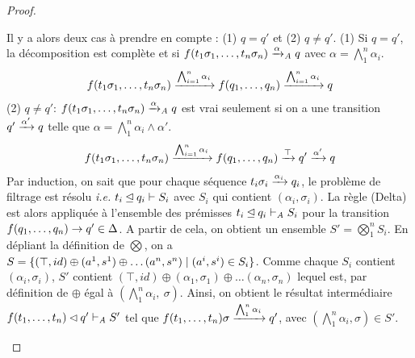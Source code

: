 \begin{proof}
\begin{itemize}
  Il y a alors deux cas à prendre en compte : (1) $q=q'$ et (2) $q \not = q'$.
  (1) Si $q=q'$, la décomposition est complète et si $f(t_1\sigma_1,\dots, t_n\sigma_n) \xrightarrow{\alpha}_\mathit A q$ avec $\alpha = \bigwedge_1^n \alpha_i$.
  \[f(t_1\sigma_1,\dots, t_n\sigma_n) \xrightarrow{\bigwedge_{i = 1}^n \alpha_i} f(q_1,\dots,q_n) \xrightarrow{\bigwedge_{i = 1}^n \alpha_i} q\]
  (2) $q \not = q'$: $f(t_1\sigma_1,\dots, t_n\sigma_n) \xrightarrow{\alpha}_\mathit A q$ est vrai seulement si on a une transition $q' \xrightarrow{\alpha'} q$
  telle que $\alpha = \bigwedge_1^n \alpha_i \land \alpha'$.
  \[f(t_1\sigma_1,\dots, t_n\sigma_n) \xrightarrow{\bigwedge_{i = 1}^n \alpha_i} f(q_1,\dots,q_n) \xrightarrow{\top} q' \xrightarrow{\alpha'} q\]
  Par induction, on sait que pour chaque séquence $t_i\sigma_i
  \xrightarrow{\alpha_i} q_i$, le problème de filtrage est résolu \textit{i.e.}
  $t_i \unlhd q_i \vdash S_i$ avec $S_i$ qui contient $(\alpha_i, \sigma_i)$.
  La règle (Delta) est alors appliquée à l'ensemble des prémisses $t_i \unlhd q_i \vdash_\mathit A S_i$ pour la transition $f(q_1,\dots,q_n) \rightarrow q' \in \Delta$.  A partir de cela,
  on obtient un ensemble $S' = \bigotimes^n_1 S_i$.  En dépliant la définition de $\bigotimes$, on a $S = \{(\top, id) \oplus (a^1, s^1) \oplus \dots (a^n, s^n) \; | \; (a^i, s^i) \in S_i \}$. 
  Comme chaque $S_i$ contient $(\alpha_i, \sigma_i)$, $S'$ contient $(\top, id) \oplus (\alpha_1, \sigma_1) \oplus \dots (\alpha_n, \sigma_n)$ lequel est, par définition de $\oplus$ égal à $(\bigwedge_1^n \alpha_i,\ \sigma)$.
  Ainsi, on obtient le résultat intermédiaire $f(t_1, \dots, t_n) \lhd q' \vdash_\mathit A S'$ tel que $f(t_1, \dots, t_n)\sigma \xrightarrow{\bigwedge_1^n \alpha_i} q'$,
  avec $(\bigwedge_1^n \alpha_i, \sigma) \in S'$.


\end{itemize}
\end{proof}
